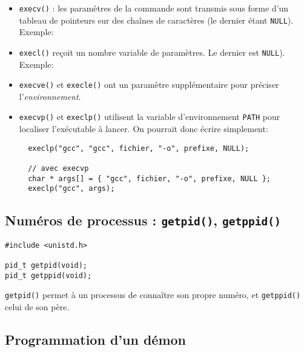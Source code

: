 \begin{itemize}
\item  \texttt{execv()} : les paramètres de la commande sont transmis
sous forme d'un tableau de pointeurs sur des chaînes de caractères (le
dernier étant \texttt{NULL}). Exemple:


\source




\item \texttt{execl()} reçoit un nombre variable de paramètres.
Le dernier est \texttt{NULL}). Exemple:


\source




\item  \texttt{execve()} et \texttt{execle()} ont un paramètre
supplémentaire pour préciser l'\emph{environnement}.  

\item 
\texttt{execvp()} et \texttt{execlp()} utilisent la variable
d'environnement \texttt{PATH} pour localiser l'exécutable à lancer. On
pourrait donc écrire simplement:

\extrait
\begin{lstlisting}
  execlp("gcc", "gcc", fichier, "-o", prefixe, NULL);

  // avec execvp
  char * args[] = { "gcc", fichier, "-o", prefixe, NULL };
  execlp("gcc", args);
\end{lstlisting}
\end{itemize}

\subsection{Numéros de processus : \texttt{getpid()}, \texttt{getppid()}}



\extrait
\begin{lstlisting}
#include <unistd.h>

pid_t getpid(void);
pid_t getppid(void);
\end{lstlisting}


\texttt{getpid()} permet à un processus de connaître son propre numéro, et 
\texttt{getppid()} celui de son père.


\subsection{Programmation d'un démon}

